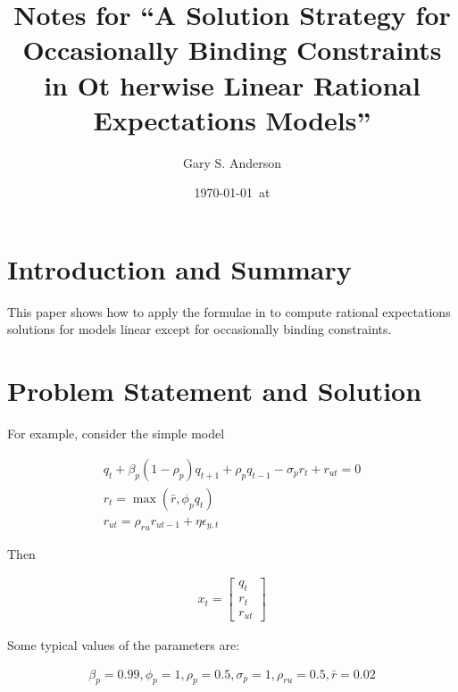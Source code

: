 \documentclass[12pt]{article}
\title{Notes for ``A Solution Strategy for Occasionally Binding Constraints in Ot
herwise
Linear Rational Expectations Models''}
\author{Gary S. Anderson}
\date{\today \   at \currenttime}
\begin{document}
\maketitle


\section{Introduction and Summary}
\label{sec:introduction-summary}

This paper shows how to apply the formulae in\citep{anderson10} to compute 
rational expectations solutions for models linear except for occasionally binding constraints.

\section{Problem Statement and Solution}
\label{sec:probl-stat-solut}



For example, consider the simple model


\begin{gather*}
q_{t} +\beta_p(1 - \rho_p)q_{t + 1} + \rho_pq_{t - 1} - \sigma_pr_{t} +
     r_{ut}=0\\
 r_{t} = \max (\bar{r}, \phi_pq_{t}) \\
 r_{ut} = \rho_{ru} r_{ut - 1} + \eta \epsilon_{y,t}
\end{gather*}

Then 
\newcommand{\xtmVec}{  \begin{bmatrix}
    q_t\\r_{t}\\r_{ut}
  \end{bmatrix}
}


\begin{gather*}
  x_t=\xtmVec
\end{gather*}

Some typical values of the parameters are:

\begin{gather*}
  \beta_p = 0.99, \phi_p = 1, 
\rho_p = 0.5, \sigma_p = 1, \rho_{ru} = 0.5,
  \bar{r} = 0.02 \\
\end{gather*}
\end{document}
